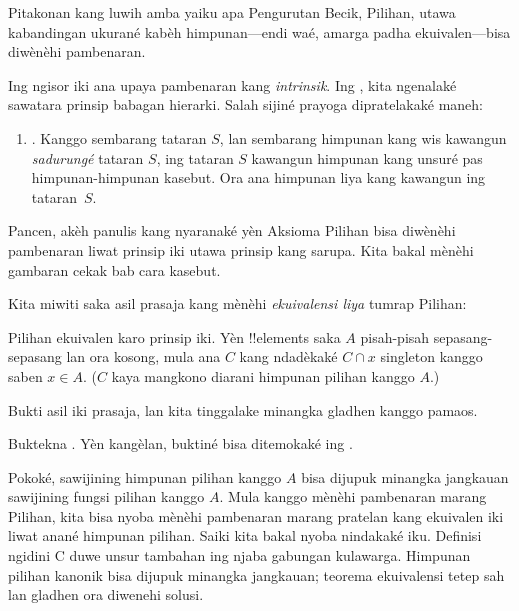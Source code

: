\documentclass[../../../include/open-logic-section]{subfiles}
\begin{document}

Pitakonan kang luwih amba yaiku apa Pengurutan Becik, Pilihan, utawa
kabandingan ukurané kabèh himpunan---endi waé, amarga padha
ekuivalen---bisa diwènèhi pambenaran.

Ing ngisor iki ana upaya pambenaran kang \emph{intrinsik}. Ing
, kita ngenalaké sawatara prinsip babagan
hierarki. Salah sijiné prayoga dipratelakaké maneh:
\begin{enumerate}
	\item[] \stagesacc. Kanggo sembarang tataran $S$, lan sembarang
	himpunan kang wis kawangun \emph{sadurungé} tataran $S$,
	ing tataran $S$ kawangun himpunan kang unsuré pas himpunan-himpunan
	kasebut. Ora ana himpunan liya kang kawangun ing tataran~$S$.
\end{enumerate}
Pancen, akèh panulis kang nyaranaké yèn Aksioma Pilihan bisa
diwènèhi pambenaran liwat prinsip iki utawa prinsip kang sarupa. Kita bakal
mènèhi gambaran cekak bab cara kasebut.

Kita miwiti saka asil prasaja kang mènèhi \emph{ekuivalensi liya}
tumrap Pilihan:

\begin{thm}[ing $\ZF$]
Pilihan ekuivalen karo prinsip iki. Yèn !!{element}s saka $A$
pisah-pisah sepasang-sepasang lan ora kosong, mula ana $C$ kang
ndadèkaké $C \cap x$ singleton kanggo saben $x \in A$. ($C$ kaya
mangkono diarani {himpunan pilihan} kanggo $A$.)
\end{thm}

Bukti asil iki prasaja, lan kita tinggalake minangka gladhen kanggo
pamaos.

\begin{prob}
Buktekna . Yèn
kangèlan, buktiné bisa ditemokaké ing
\cite[kaca~242--3]{Potter2004}.
\end{prob}

Pokoké, sawijining himpunan pilihan kanggo $A$ bisa dijupuk minangka jangkauan sawijining
fungsi pilihan kanggo $A$. Mula kanggo mènèhi pambenaran marang Pilihan, kita bisa
nyoba mènèhi pambenaran marang pratelan kang ekuivalen iki liwat anané himpunan
pilihan. Saiki kita bakal nyoba nindakaké iku.
Definisi ngidini C duwe unsur tambahan ing njaba gabungan kulawarga. Himpunan pilihan kanonik bisa dijupuk minangka jangkauan; teorema ekuivalensi tetep sah lan gladhen ora diwenehi solusi.
\end{document}
